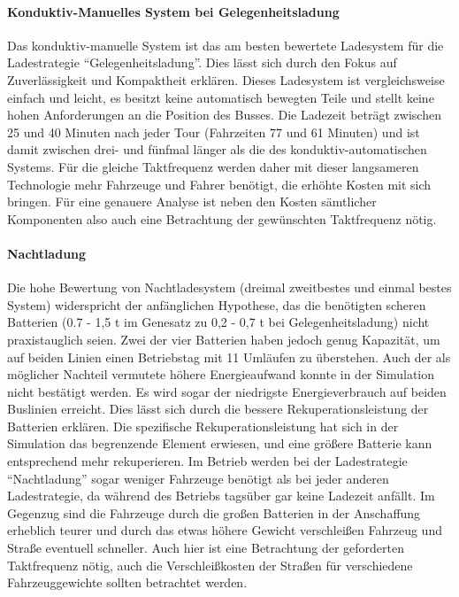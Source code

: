 \paragraph{Konduktiv-Manuelles System bei Gelegenheitsladung} Das konduktiv-manuelle System ist das am besten bewertete Ladesystem für die Ladestrategie "`Gelegenheitsladung"'. Dies lässt sich durch den Fokus auf Zuverlässigkeit und Kompaktheit erklären. Dieses Ladesystem ist vergleichsweise einfach und leicht, es besitzt keine automatisch bewegten Teile und stellt keine hohen Anforderungen an die Position des Busses. Die Ladezeit beträgt zwischen 25 und 40 Minuten nach jeder Tour (Fahrzeiten 77 und 61 Minuten) und ist damit zwischen drei- und fünfmal länger als die des konduktiv-automatischen Systems. Für die gleiche Taktfrequenz werden daher mit dieser langsameren Technologie mehr Fahrzeuge und Fahrer benötigt, die erhöhte Kosten mit sich bringen. Für eine genauere Analyse ist neben den Kosten sämtlicher Komponenten also auch eine Betrachtung der gewünschten Taktfrequenz nötig.

\paragraph{Nachtladung} Die hohe Bewertung von Nachtladesystem (dreimal zweitbestes und einmal bestes System) widerspricht der anfänglichen Hypothese, das die benötigten scheren Batterien (0.7 - 1,5 t im Genesatz zu 0,2 - 0,7 t bei Gelegenheitsladung) nicht praxistauglich seien. Zwei der vier Batterien haben jedoch genug Kapazität, um auf beiden Linien einen Betriebstag mit 11 Umläufen zu überstehen. Auch der als möglicher Nachteil vermutete höhere Energieaufwand konnte in der Simulation nicht bestätigt werden. Es wird sogar der niedrigste Energieverbrauch auf beiden Buslinien erreicht. Dies lässt sich durch die bessere Rekuperationsleistung der Batterien erklären. Die spezifische Rekuperationsleistung hat sich in der Simulation das begrenzende Element erwiesen, und eine größere Batterie kann entsprechend mehr rekuperieren. Im Betrieb werden bei der Ladestrategie "`Nachtladung"' sogar weniger Fahrzeuge benötigt als bei jeder anderen Ladestrategie, da während des Betriebs tagsüber gar keine Ladezeit anfällt. Im Gegenzug sind die Fahrzeuge durch die großen Batterien in der Anschaffung erheblich teurer und durch das etwas höhere Gewicht verschleißen Fahrzeug und Straße eventuell schneller. Auch hier ist eine Betrachtung der geforderten Taktfrequenz nötig, auch die Verschleißkosten der Straßen für verschiedene Fahrzeuggewichte sollten betrachtet werden.

